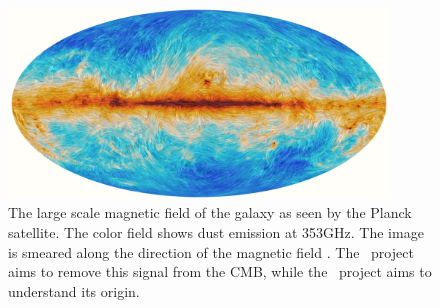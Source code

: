 
\begin{figure} \begin{center}
\includegraphics[width=0.9\textwidth]{figs/2015_353GHz_B-field.png}
\caption[ ]{The large scale magnetic field of the galaxy as seen by the Planck
satellite. The color field shows dust emission at 353GHz.  The image is smeared
along the direction of the magnetic field \citep{PlanckXIX15}.  The \nameCMB\
project aims to remove this signal from the CMB, while the \nameGalaxies\
project aims to understand its origin.}
\label{fig.planck} \end{center} \end{figure}
